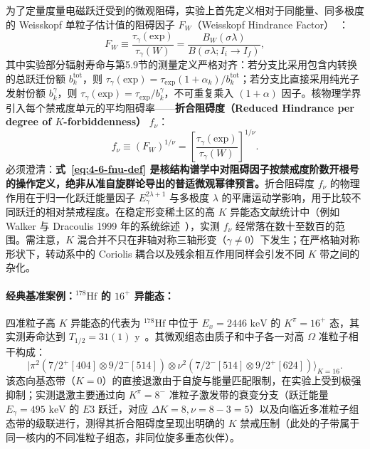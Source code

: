 为了定量度量电磁跃迁受到的微观阻碍，实验上首先定义相对于同能量、同多极度的 Weisskopf 单粒子估计值的阻碍因子 $F_W$（Weisskopf Hindrance Factor）~\cite{book-jain-nuclear-isomers}：
\begin{equation}\label{eq:4-6-FW-def}
F_W \equiv \frac{\tau_\gamma(\mathrm{exp})}{\tau_\gamma(W)} = \frac{B_W(\sigma\lambda)}{B(\sigma\lambda; I_i \to I_f)},
\end{equation}
其中实验部分辐射寿命与第5.9节的测量定义严格对齐：若分支比采用包含内转换的总跃迁份额 $b_k^{\mathrm{tot}}$，则 $\tau_\gamma(\mathrm{exp}) = \tau_{\mathrm{exp}} (1 + \alpha_k) / b_k^{\mathrm{tot}}$；若分支比直接采用纯光子发射份额 $b_k^\gamma$，则 $\tau_\gamma(\mathrm{exp}) = \tau_{\mathrm{exp}} / b_k^\gamma$，不可重复乘入 $(1+\alpha)$ 因子。核物理学界引入每个禁戒度单元的平均阻碍率——\textbf{折合阻碍度（Reduced Hindrance per degree of $K$-forbiddenness）} $f_\nu$：
\begin{equation}\label{eq:4-6-fnu-def}
f_\nu \equiv (F_W)^{1/\nu} = \left[ \frac{\tau_\gamma(\mathrm{exp})}{\tau_\gamma(W)} \right]^{1/\nu}.
\end{equation}
必须澄清：\textbf{式~\eqref{eq:4-6-fnu-def} 是核结构谱学中对阻碍因子按禁戒度阶数开根号的操作定义，绝非从准自旋群论导出的普适微观幂律预言。}折合阻碍度 $f_\nu$ 的物理作用在于归一化跃迁能量因子 $E_\gamma^{2\lambda+1}$ 与多极度 $\lambda$ 的平庸运动学影响，用于比较不同跃迁的相对禁戒程度。在稳定形变稀土区的高 $K$ 异能态文献统计中（例如 Walker 与 Dracoulis 1999 年的系统综述~\cite{walker-1999-nature-nuclear-isomers}），实测 $f_\nu$ 经常落在数十至数百的范围。需注意，$K$ 混合并不只在非轴对称三轴形变（$\gamma \ne 0$）下发生；在严格轴对称形状下，转动系中的 Coriolis 耦合以及残余相互作用同样会引发不同 $K$ 带之间的杂化。

\paragraph{经典基准案例：$^{178}\mathrm{Hf}$ 的 $16^+$ 异能态：}
四准粒子高 $K$ 异能态的代表为 $^{178}\mathrm{Hf}$ 中位于 $E_x = 2446\text{ keV}$ 的 $K^\pi = 16^+$ 态，其实测寿命达到 $T_{1/2} = 31(1)\text{ y}$~\cite{walker-1999-nature-nuclear-isomers}。其微观组态由质子和中子各一对高 $\Omega$ 准粒子相干构成：
\begin{equation}\label{eq:4-6-178hf-config}
|\pi^2(7/2^+[404] \otimes 9/2^-[514]) \otimes \nu^2(7/2^-[514] \otimes 9/2^+[624])\rangle_{K=16}.
\end{equation}
该态向基态带（$K=0$）的直接退激由于自旋与能量匹配限制，在实验上受到极强抑制；实测退激主要通过向 $K^\pi = 8^-$ 准粒子激发带的衰变分支（跃迁能量 $E_\gamma = 495\text{ keV}$ 的 $E3$ 跃迁，对应 $\Delta K = 8, \nu = 8 - 3 = 5$）以及向临近多准粒子组态带的级联进行，测得其折合阻碍度呈现出明确的 $K$ 禁戒压制（此处的子带属于同一核内的不同准粒子组态，非同位旋多重态伙伴）。

